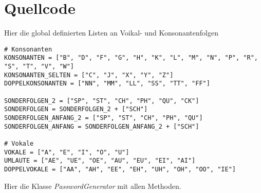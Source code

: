 \documentclass[a4paper,10pt,ngerman]{scrartcl}
\begin{document}
\section{Quellcode}
Hier die global definierten Listen an Voikal- und Konsonantenfolgen
\begin{lstlisting}
# Konsonanten
KONSONANTEN = ["B", "D", "F", "G", "H", "K", "L", "M", "N", "P", "R", "S", "T", "V", "W"]
KONSONANTEN_SELTEN = ["C", "J", "X", "Y", "Z"]
DOPPELKONSONANTEN = ["NN", "MM", "LL", "SS", "TT", "FF"]

SONDERFOLGEN_2 = ["SP", "ST", "CH", "PH", "QU", "CK"]
SONDERFOLGEN = SONDERFOLGEN_2 + ["SCH"]
SONDERFOLGEN_ANFANG_2 = ["SP", "ST", "CH", "PH", "QU"]
SONDERFOLGEN_ANFANG = SONDERFOLGEN_ANFANG_2 + ["SCH"]

# Vokale
VOKALE = ["A", "E", "I", "O", "U"]
UMLAUTE = ["AE", "UE", "OE", "AU", "EU", "EI", "AI"]
DOPPELVOKALE = ["AA", "AH", "EE", "EH", "UH", "OH", "OO", "IE"]
\end{lstlisting}
Hier die Klasse \textit{PasswordGenerator} mit allen Methoden.
\end{document}
